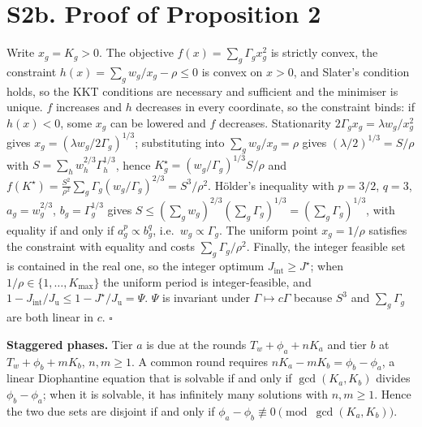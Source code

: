 \documentclass[journal]{IEEEtran}
\begin{document}
\section{S2b. Proof of Proposition 2}
\label{supp:cuberoot}
Write $x_g=K_g>0$. The objective $f(x)=\sum_g\Gamma_gx_g^2$ is strictly convex, the constraint $h(x)=\sum_gw_g/x_g-\rho\le0$ is convex on $x>0$, and Slater's condition holds, so the KKT conditions are necessary and sufficient and the minimiser is unique. $f$ increases and $h$ decreases in every coordinate, so the constraint binds: if $h(x)<0$, some $x_g$ can be lowered and $f$ decreases. Stationarity $2\Gamma_gx_g=\lambda w_g/x_g^2$ gives $x_g=(\lambda w_g/2\Gamma_g)^{1/3}$; substituting into $\sum_gw_g/x_g=\rho$ gives $(\lambda/2)^{1/3}=S/\rho$ with $S=\sum_hw_h^{2/3}\Gamma_h^{1/3}$, hence $K_g^\star=(w_g/\Gamma_g)^{1/3}S/\rho$ and $f(K^\star)=\frac{S^2}{\rho^2}\sum_g\Gamma_g(w_g/\Gamma_g)^{2/3}=S^3/\rho^2$. H\"older's inequality with $p=3/2$, $q=3$, $a_g=w_g^{2/3}$, $b_g=\Gamma_g^{1/3}$ gives $S\le(\sum_gw_g)^{2/3}(\sum_g\Gamma_g)^{1/3}=(\sum_g\Gamma_g)^{1/3}$, with equality if and only if $a_g^p\propto b_g^q$, i.e.\ $w_g\propto\Gamma_g$. The uniform point $x_g=1/\rho$ satisfies the constraint with equality and costs $\sum_g\Gamma_g/\rho^2$. Finally, the integer feasible set is contained in the real one, so the integer optimum $J_{\mathrm{int}}\ge J^\star$; when $1/\rho\in\{1,\dots,K_{\max}\}$ the uniform period is integer-feasible, and $1-J_{\mathrm{int}}/J_{\mathrm u}\le1-J^\star/J_{\mathrm u}=\Psi$. $\Psi$ is invariant under $\Gamma\mapsto c\Gamma$ because $S^3$ and $\sum_g\Gamma_g$ are both linear in $c$. \hfill$\square$

\textbf{Staggered phases.} Tier $a$ is due at the rounds $T_w+\phi_a+nK_a$ and tier $b$ at $T_w+\phi_b+mK_b$, $n,m\ge1$. A common round requires $nK_a-mK_b=\phi_b-\phi_a$, a linear Diophantine equation that is solvable if and only if $\gcd(K_a,K_b)$ divides $\phi_b-\phi_a$; when it is solvable, it has infinitely many solutions with $n,m\ge1$. Hence the two due sets are disjoint if and only if $\phi_a-\phi_b\not\equiv0\pmod{\gcd(K_a,K_b)}$.
\end{document}
